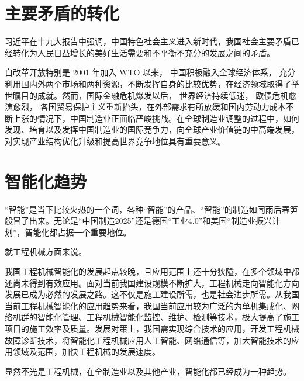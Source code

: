 \section{主要矛盾的转化}

习近平在十九大报告中强调，中国特色社会主义进入新时代，我国社会主要矛盾已经转化为人民日益增长的美好生活需要和不平衡不充分的发展之间的矛盾。

自改革开放特别是 2001 年加入 WTO 以来， 中国积极融入全球经济体系， 充分利用国内外两个市场和两种资源，不断发挥自身的比较优势，在经济领域取得了举世瞩目的成就。然而，国际金融危机爆发以后， 世界经济持续低迷， 欧债危机愈演愈烈， 各国贸易保护主义重新抬头，在外部需求有所放缓和国内劳动力成本不断上涨的情况下，中国制造业正面临严峻挑战。在全球制造业调整的过程中，如何发现、培育以及发挥中国制造业的国际竞争力，向全球产业价值链的中高端发展， 对实现产业结构优化升级和提高世界竞争地位具有重要意义\cite{xianzhuang}。

\section{智能化趋势}

“智能”是当下比较火热的一个词，各种“智能”的产品、“智能”的制造如同雨后春笋般冒了出来。无论是“中国制造2025”还是德国“工业4.0”和美国“制造业振兴计划”，智能化都占据一个重要地位。

就工程机械方面来说。

我国工程机械智能化的发展起点较晚，且应用范围上还十分狭隘，在多个领域中都还尚未得到有效应用。面对当前我国建设规模不断扩大，工程机械走向智能化方向发展已成为必然的发展之路。这不仅是施工建设所需，也是社会进步所需。从我国当前工程机械智能化的应用趋势来看，我国当前应用较为广泛的为单机集成化、网络机群的智能化管理、工程机械智能化监控、维护、检测等技术，极大提高了施工项目的施工效率及质量。发展对策上，我国需实现综合技术的应用，开发工程机械故障诊断技术，将智能化工程机械应用人工智能、网络通信等，加大智能技术的应用领域及范围，加快工程机械的发展速度\cite{zhinenghua}。

显然不光是工程机械，在全制造业以及其他产业，智能化都已经成为一种趋势。
